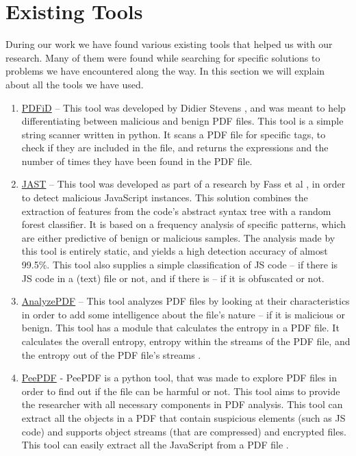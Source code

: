 \documentclass{article}
\begin{document}
\section{Existing Tools}
\indent During our work we have found various existing tools that helped us with our research. Many of them were found while searching for specific solutions to problems we have encountered along the way. In this section we will explain about all the tools we have used.
\begin{enumerate}
	\item \underline{PDFiD} – This tool was developed by Didier Stevens \cite{1}, and was meant to help differentiating between malicious and benign PDF files. This tool is a simple string scanner written in python. It scans a PDF file for specific tags, to check if they are included in the file, and returns the expressions and the number of times they have been found in the PDF file.
	\item \underline{JAST} – This tool was developed as part of a research by Fass et al \cite{JAST2018}, in order to detect malicious JavaScript instances. This solution combines the extraction of features from the code's abstract syntax tree with a random forest classifier. It is based on a frequency analysis of specific patterns, which are either predictive of benign or malicious samples. The analysis made by this tool is entirely static, and yields a high detection accuracy of almost 99.5\%. This tool also supplies a simple classification of JS code – if there is JS code in a (text) file or not, and if there is – if it is obfuscated or not.
	\item \underline{AnalyzePDF} – This tool analyzes PDF files by looking at their characteristics in order to add some intelligence about the file's nature – if it is malicious or benign. This tool has a module that calculates the entropy in a PDF file. It calculates the overall entropy, entropy within the streams of the PDF file, and the entropy out of the PDF file's streams \cite{AnalyzePDF2014}.
	\item \underline{PeePDF} - PeePDF is a python tool, that was made to explore PDF files in order to find out if the file can be harmful or not. This tool aims to provide the researcher with all necessary components in PDF analysis. This tool can extract all the objects in a PDF that contain suspicious elements (such as JS code) and supports object streams (that are compressed) and encrypted files. This tool can easily extract all the JavaScript from a PDF file \cite{Peepdf2016}.
\end{enumerate}
\end{document}
